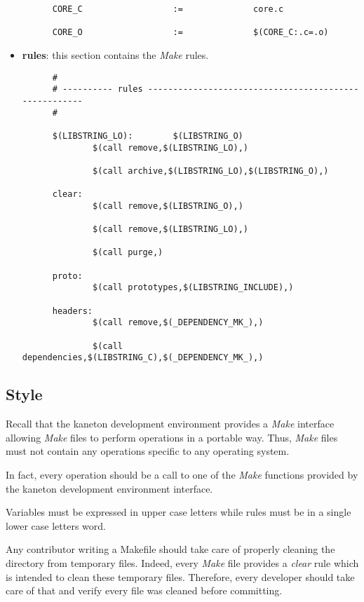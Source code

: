 \begin{itemize}
\begin{verbatim}
      CORE_C                  :=              core.c

      CORE_O                  :=              $(CORE_C:.c=.o)
    \end{verbatim}
  \item
    \textbf{rules}: this section contains the \textit{Make} rules.

    \begin{verbatim}
      #
      # ---------- rules ------------------------------------------------------
      #

      $(LIBSTRING_LO):        $(LIBSTRING_O)
              $(call remove,$(LIBSTRING_LO),)

              $(call archive,$(LIBSTRING_LO),$(LIBSTRING_O),)

      clear:
              $(call remove,$(LIBSTRING_O),)

              $(call remove,$(LIBSTRING_LO),)

              $(call purge,)

      proto:
              $(call prototypes,$(LIBSTRING_INCLUDE),)

      headers:
              $(call remove,$(_DEPENDENCY_MK_),)

              $(call dependencies,$(LIBSTRING_C),$(_DEPENDENCY_MK_),)
    \end{verbatim}
\end{itemize}


\subsection{Style}

Recall that the kaneton development environment provides a \textit{Make}
interface allowing \textit{Make} files to perform operations in a portable
way. Thus, \textit{Make} files must not contain any operations specific
to any operating system.

In fact, every operation should be a call to one of the \textit{Make} functions
provided by the kaneton development environment interface.

Variables must be expressed in upper case letters while rules must be in a
single lower case letters word.

Any contributor writing a Makefile should take care of properly cleaning
the directory from temporary files. Indeed, every \textit{Make} file
provides a \textit{clear} rule which is intended to clean these temporary
files. Therefore, every developer should take care of that and verify every
file was cleaned before committing.

